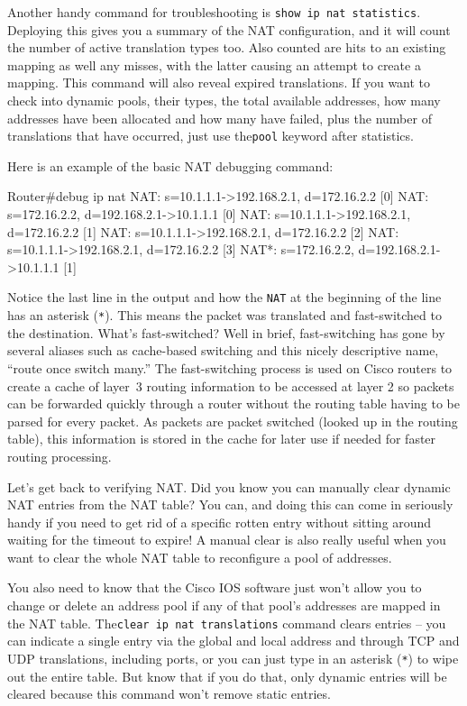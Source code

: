 Another handy command for troubleshooting is
\texttt{show\ ip\ nat\ statistics}. Deploying this gives you a summary
of the NAT configuration, and it will count the number of active
translation types too. Also counted are hits to an existing mapping as
well any misses, with the latter causing an attempt to create a mapping.
This command will also reveal expired translations. If you want to check
into dynamic pools, their types, the total available addresses, how many
addresses have been allocated and how many have failed, plus the number
of translations that have occurred, just use the\texttt{pool} keyword
after statistics.

Here is an example of
the basic NAT debugging command:

\begin{cli}
Router#debug ip nat
NAT: s=10.1.1.1->192.168.2.1, d=172.16.2.2 [0]
NAT: s=172.16.2.2, d=192.168.2.1->10.1.1.1 [0]
NAT: s=10.1.1.1->192.168.2.1, d=172.16.2.2 [1]
NAT: s=10.1.1.1->192.168.2.1, d=172.16.2.2 [2]
NAT: s=10.1.1.1->192.168.2.1, d=172.16.2.2 [3]
NAT*: s=172.16.2.2, d=192.168.2.1->10.1.1.1 [1]
\end{cli}

Notice the last line in the output and how the \texttt{NAT} at the
beginning of the line has an asterisk (\texttt{*}). This means the
packet was translated and fast-switched to the destination. What's
fast-switched? Well in brief, fast-switching has gone by several aliases
such as cache-based switching and this nicely descriptive name, ``route
once switch many.'' The fast-switching process is used on Cisco routers
to create a cache of layer~3 routing information to be accessed at layer
2 so packets can be forwarded quickly through a router without the
routing table having to be parsed for every packet. As packets are
packet switched (looked up in the routing table), this information is
stored in the cache for later use if needed for faster routing
processing.

Let's get back to verifying NAT. Did you know you can manually clear
dynamic NAT entries from the NAT table? You can, and doing this can come
in seriously handy if you need to get rid of a specific rotten entry
without sitting around waiting for the timeout to expire! A manual clear
is also really useful when you want to clear the whole NAT table to
reconfigure a pool of addresses.

You also need to know that the Cisco IOS software just won't allow you
to change or delete an address pool if any of that pool's addresses are
mapped in the NAT table. The\texttt{clear\ ip\ nat\ translations}
command clears entries -- you can indicate a single entry via the global
and local address and through TCP and UDP translations, including ports,
or you can just type in an asterisk (\texttt{*}) to wipe out the entire
table. But know that if you do that, only dynamic entries will be
cleared because this command won't remove static entries.

